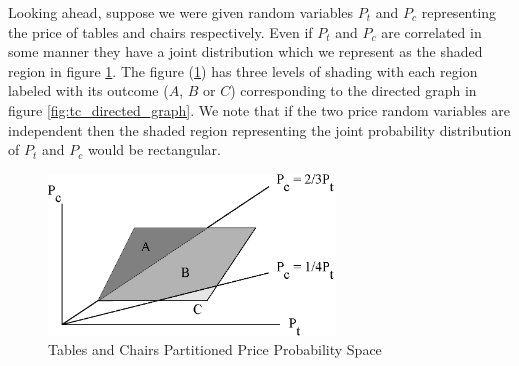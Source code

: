 Looking ahead, suppose we were given random variables $P_t$ and $P_c$
representing the price of tables and chairs respectively. Even if
$P_t$ and $P_c$ are correlated in some manner they have a joint
distribution which we represent as the shaded region in figure
\ref{fig:tc_joint_prices}. The figure (\ref{fig:tc_joint_prices}) has
three levels of shading with each region labeled with its outcome
($A$, $B$ or $C$) corresponding to the directed graph in figure
\ref{fig:tc_directed_graph}. We note that if the two price random
variables are independent then the shaded region representing the
joint probability distribution of $P_t$ and $P_c$ would be
rectangular. 

\begin{figure}
  \centering
  \includegraphics[width=3in]{Images/tc_joint_prices}
  \caption[Tables and Chairs Partitioned Price Probability Space]
          {Tables and Chairs Partitioned Price Probability Space}
  \label{fig:tc_joint_prices}
\end{figure}


